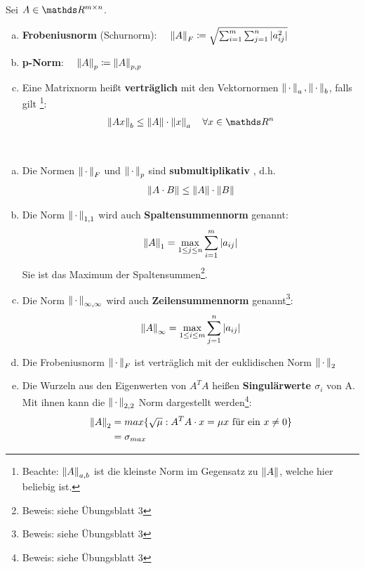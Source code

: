 \begin{Defe}
  \label{3.2.5}
  Sei $A\in \R^{m\times n}$.
  \begin{enumerate}[a)]
  \item \textbf{Frobeniusnorm} (Schurnorm):
    $ \quad \nn{A}_F \coloneqq \sqrt{\sum_{i=1}^{m}\sum_{j=1}^{n}|a_{ij}^2|}
    \index{Norm!Frobeniusnorm}$
  \item \textbf{p-Norm}: 
    $\quad \nn{A}_p \coloneqq \nn{A}_{p,p}
    \index{p-Norm}$
  \item Eine Matrixnorm heißt \textbf{verträglich}  mit den Vektornormen 
    $\left\| \,\cdot\, \right\|_a, \left\| \,\cdot\, \right\|_b$, falls gilt
    \footnote{ Beachte: $\left\| A \right\|_{a,b}$ ist die kleinste Norm im Gegensatz zu $\left\| A \right\|$, welche hier beliebig ist.}:
    \begin{gather*}
      \nn{Ax}_b \leq \nn{A}\cdot \nn{x}_a \quad \forall x\in \R^n
    \end{gather*}
  \end{enumerate}
\end{Defe}

\begin{Beme}~
  \label{3.2.6}
  \begin{enumerate}[a)]
  \item Die Normen $\left\| \,\cdot\, \right\|_F$ und $\left\| \,\cdot\, \right\|_p$ sind \textbf{submultiplikativ} , d.h.
    \begin{gather*}
      \left\| A\cdot B \right\| \leq \left\| A \right\|\cdot\left\| B \right\|
    \end{gather*}
  \item Die Norm $\left\| \,\cdot\, \right\|_{1,1}$ wird auch \textbf{Spaltensummennorm} genannt:
    \begin{gather*}
      \left\| A \right\|_1 = \max_{1\leq j \leq n}\sum_{i=1}^{m}|a_{ij}|
    \end{gather*}
    Sie ist das Maximum der Spaltensummen\footnote{Beweis: siehe Übungsblatt 3}.
  \item Die Norm $\left\| \,\cdot\, \right\|_{\infty, \infty}$ wird auch \textbf{Zeilensummennorm} 
    genannt\footnote{Beweis: siehe Übungsblatt 3}:
    \begin{gather*}
      \left\| A \right\|_\infty = \max_{1\leq i \leq m}\sum_{j=1}^{n}|a_{ij}|
    \end{gather*}
  \item Die Frobeniusnorm $\left\| \,\cdot\, \right\|_F$ ist verträglich mit der euklidischen Norm $\left\| \,\cdot\, \right\|_2$
  \item Die Wurzeln aus den Eigenwerten von $A^TA$ heißen \textbf{Singulärwerte $\sigma_i$}  von A.
    Mit ihnen kann die $\left\| \,\cdot\, \right\|_{2,2}$ Norm dargestellt werden\footnote{Beweis: siehe Übungsblatt 3}:
    \begin{align*}
      \left\| A \right\|_2 &= max \{\sqrt{\mu} : A^TA\cdot x = \mu x\text{ für ein }x\neq 0 \} \\
               & = \sigma_{max}
    \end{align*}
  \end{enumerate}
\end{Beme}


